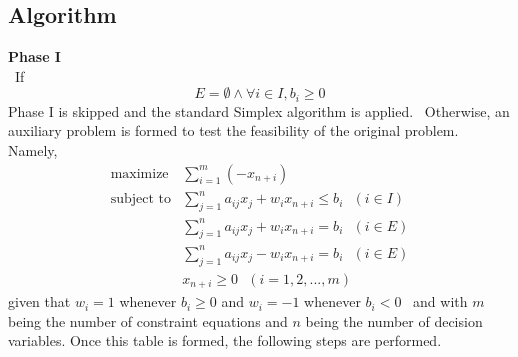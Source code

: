 \documentclass[11pt]{article}
\begin{document}
\subsection{Algorithm}
\textbf{Phase I}\\
~\indent If $$E = \emptyset  \land  \forall i \in I, b_i \geq 0$$ Phase I is skipped and the standard Simplex algorithm is applied.~\cite{wolfram} Otherwise, an auxiliary problem is formed to test the feasibility of the original problem. Namely,~\cite{wolfram}
\begin{eqnarray*}
\mbox{maximize}& \sum\limits_{i=1}^m (-x_{n+i})\\
\mbox{subject to}& \sum\limits_{j=1}^n a_{ij}x_j + w_ix_{n+i} \leq b_i\mbox{\ \ }(i \in I)\\
 & \sum\limits_{j=1}^n a_{ij}x_j + w_ix_{n+i} = b_i\mbox{\ \ }(i \in E)\\
 & \sum\limits_{j=1}^n a_{ij}x_j - w_ix_{n+i} = b_i\mbox{\ \ }(i \in E)\\
 & x_{n+i} \geq 0\mbox{\ \ }(i = 1, 2,...,m)
\end{eqnarray*}
given that $w_i = 1$ whenever $b_i \geq 0$ and $w_i = -1$ whenever $b_i < 0$~\cite{chvatal83} and with $m$ being the number of constraint equations and $n$ being the number of decision variables. Once this table is formed, the following steps are performed.
\end{document}
